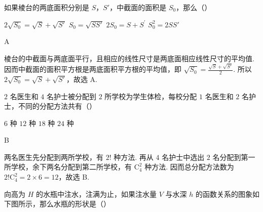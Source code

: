 \documentclass[UTF8,a4paper,oneside,11pt]{ctexbook}
\begin{document}
\begin{problem}
如果棱台的两底面积分别是 \(S\)，\(S'\)，中截面的面积是 \(S_0\)，那么（\quad）

\choices
    {\(2\sqrt{S_0} = \sqrt{S} + \sqrt{S'}\)}
    {\(S_0 = \sqrt{SS'}\)}
    {\(2S_{0} = S + S^{\prime}\)}
    {\(S_0^2 = 2SS'\)}
\end{problem}

\begin{answer}
A
\end{answer}

\begin{solution}
棱台的中截面与两底面平行，且相应的线性尺寸是两底面相应线性尺寸的平均值. 因而中截面的面积平方根是两底面积平方根的平均值，即
\(\sqrt{S_{0}}=\frac{\sqrt{S}+\sqrt{S'}}{2}\). 所以
\(2\sqrt{S_{0}}=\sqrt{S}+\sqrt{S'}\)，故选 A.
\end{solution}

\begin{problem}
\(2\) 名医生和 \(4\) 名护士被分配到 \(2\) 所学校为学生体检，每校分配 \(1\) 名医生和 \(2\) 名护士，不同的分配方法共有（\quad）

\choices
    {\(6\) 种}
    {\(12\) 种}
    {\(18\) 种}
    {\(24\) 种}
\end{problem}

\begin{answer}
B
\end{answer}

\begin{solution}
两名医生先分配到两所学校，有 \(2!\) 种方法. 再从 \(4\) 名护士中选出 \(2\) 名分配到第一所学校，余下两名分配到第二所学校，有 \(\mathrm C_{4}^{2}\) 种方法. 因而总分配方法数为
\(2!\mathrm C_{4}^{2}=2\times6=12\)，故选 B.
\end{solution}

\begin{problem}
向高为 \(H\) 的水瓶中注水，注满为止，如果注水量 \(V\) 与水深 \(h\) 的函数关系的图象如下图所示，那么水瓶的形状是（\quad）


\choices
    {}
    {}
    {}
    {}
\end{problem}
\end{document}
